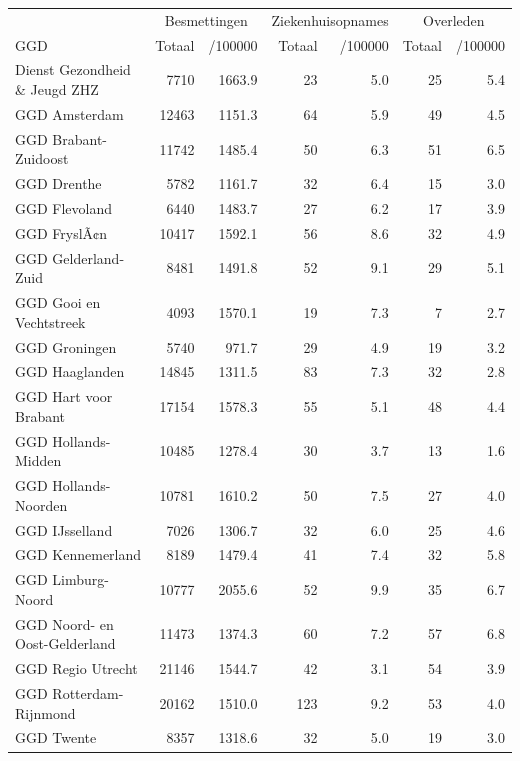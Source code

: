 \documentclass[
  english,
  man,floatsintext]{apa6}
\begin{document}
\begin{table}
\centering\begingroup\fontsize{10}{12}\selectfont

\begin{threeparttable}
\begin{tabular}{lrrrrrr}
\toprule
\multicolumn{1}{c}{ } & \multicolumn{2}{c}{Besmettingen} & \multicolumn{2}{c}{Ziekenhuisopnames} & \multicolumn{2}{c}{Overleden} \\
\cmidrule(l{3pt}r{3pt}){2-3} \cmidrule(l{3pt}r{3pt}){4-5} \cmidrule(l{3pt}r{3pt}){6-7}
GGD & Totaal & /100000 & Totaal & /100000 & Totaal & /100000\\
\midrule
Dienst Gezondheid \& Jeugd ZHZ & 7710 & 1663.9 & 23 & 5.0 & 25 & 5.4\\
GGD Amsterdam & 12463 & 1151.3 & 64 & 5.9 & 49 & 4.5\\
GGD Brabant-Zuidoost & 11742 & 1485.4 & 50 & 6.3 & 51 & 6.5\\
GGD Drenthe & 5782 & 1161.7 & 32 & 6.4 & 15 & 3.0\\
GGD Flevoland & 6440 & 1483.7 & 27 & 6.2 & 17 & 3.9\\
GGD FryslÃ¢n & 10417 & 1592.1 & 56 & 8.6 & 32 & 4.9\\
GGD Gelderland-Zuid & 8481 & 1491.8 & 52 & 9.1 & 29 & 5.1\\
GGD Gooi en Vechtstreek & 4093 & 1570.1 & 19 & 7.3 & 7 & 2.7\\
GGD Groningen & 5740 & 971.7 & 29 & 4.9 & 19 & 3.2\\
GGD Haaglanden & 14845 & 1311.5 & 83 & 7.3 & 32 & 2.8\\
GGD Hart voor Brabant & 17154 & 1578.3 & 55 & 5.1 & 48 & 4.4\\
GGD Hollands-Midden & 10485 & 1278.4 & 30 & 3.7 & 13 & 1.6\\
GGD Hollands-Noorden & 10781 & 1610.2 & 50 & 7.5 & 27 & 4.0\\
GGD IJsselland & 7026 & 1306.7 & 32 & 6.0 & 25 & 4.6\\
GGD Kennemerland & 8189 & 1479.4 & 41 & 7.4 & 32 & 5.8\\
GGD Limburg-Noord & 10777 & 2055.6 & 52 & 9.9 & 35 & 6.7\\
GGD Noord- en Oost-Gelderland & 11473 & 1374.3 & 60 & 7.2 & 57 & 6.8\\
GGD Regio Utrecht & 21146 & 1544.7 & 42 & 3.1 & 54 & 3.9\\
GGD Rotterdam-Rijnmond & 20162 & 1510.0 & 123 & 9.2 & 53 & 4.0\\
GGD Twente & 8357 & 1318.6 & 32 & 5.0 & 19 & 3.0\\

\end{tabular}
\end{threeparttable}
\end{table}
\end{document}

